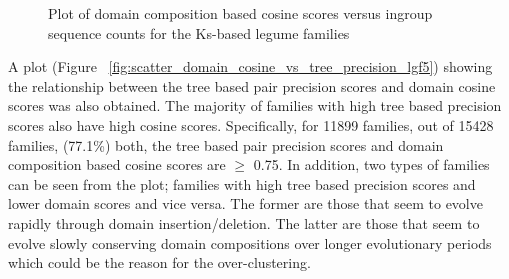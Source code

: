 \documentclass{article}
\begin{document}
		\begin{figure}
			\caption{Plot of domain composition based cosine scores versus ingroup sequence counts for the Ks-based legume families}
			\label{fig:scatter_domain_cosine_vs_seq_ct_lgf5}
		\end{figure}
		
		A plot (Figure ~\ref{fig:scatter_domain_cosine_vs_tree_precision_lgf5}) showing the relationship between the tree based pair precision scores and domain cosine scores was also obtained. The majority of families with high tree based precision scores also have high cosine scores. Specifically, for 11899 families, out of 15428 families, (77.1\%) both, the tree based pair precision scores and domain composition based cosine scores are $\geq$ 0.75.  In addition, two types of families can be seen from the plot; families with high tree based precision scores and lower domain scores and vice versa. The former are those that seem to evolve rapidly through domain insertion/deletion. The latter are those that seem to evolve slowly conserving domain compositions over longer evolutionary periods which could be the reason for the over-clustering.
		
\end{document}
